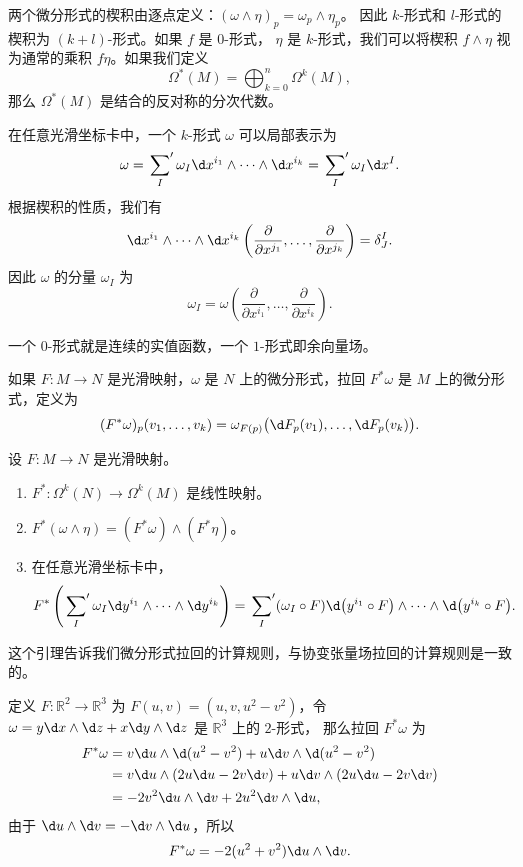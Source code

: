 两个微分形式的楔积由逐点定义：$(\omega\wedge\eta)_p=\omega_p\wedge\eta_p$。
因此 $k$-形式和 $l$-形式的楔积为 $(k+l)$-形式。如果 $f$ 是 $0$-形式，
$\eta$ 是 $k$-形式，我们可以将楔积 $f\wedge \eta$ 视为通常的乘积
$f\eta$。如果我们定义
\begin{equation}
  \Omega^*(M)=\bigoplus_{k=0}^n\Omega^k(M),
\end{equation}
那么 $\Omega^*(M)$ 是结合的反对称的分次代数。

在任意光滑坐标卡中，一个 $k$-形式 $\omega$ 可以局部表示为
\[
  \omega=\sideset{}{'}\sum_I\omega_I\d x^{i_1}\wedge
  \cdots\wedge \d x^{i_k}=\sideset{}{'}\sum_I\omega_I \d x^I.
\]
根据楔积的性质，我们有
\[
  \d x^{i_1}\wedge
  \cdots\wedge \d x^{i_k}
  \left(\frac{\partial}{\partial x^{j_1}},\dots,\frac{\partial}{\partial x^{j_k}}\right)
  =\delta_J^I.
\]
因此 $\omega$ 的分量 $\omega_I$ 为
\[
  \omega_I=\omega\left(\frac{\partial}{\partial x^{i_1}},\dots,\frac{\partial}{\partial x^{i_k}}\right)  .
\]

\begin{example}
  一个 $0$-形式就是连续的实值函数，一个 $1$-形式即余向量场。
\end{example}

如果 $F:M\to N$ 是光滑映射，$\omega$ 是 $N$ 上的微分形式，拉回
$F^*\omega$ 是 $M$ 上的微分形式，定义为
\[
  (F^*\omega)_p(v_1,\dots,v_k)=\omega_{F(p)}\bigl(\d F_p(v_1),\dots,\d F_p(v_k)\bigr)  .
\]

\begin{lemma}
  设 $F:M\to N$ 是光滑映射。
  \begin{enumerate}
    \item $F^*:\Omega^k(N)\to \Omega^k(M)$ 是线性映射。
    \item $F^*(\omega\wedge\eta)=(F^*\omega)\wedge(F^*\eta)$。
    \item 在任意光滑坐标卡中，
    \[
      F^*\left(\sideset{}{'}\sum_I\omega_I\d y^{i_1}\wedge\cdots\wedge\d y^{i_k}\right)  
      =\sideset{}{'}\sum_I(\omega_I\circ F)\d\bigl(y^{i_1}\circ F\bigr)\wedge
      \cdots\wedge \d \bigl(y^{i_k}\circ F\bigr).
    \]
  \end{enumerate}
\end{lemma}

这个引理告诉我们微分形式拉回的计算规则，与协变张量场拉回的计算规则是一致的。

\begin{example}
  定义 $F:\mathbb{R}^2\to \mathbb{R}^3$ 为 $F(u,v)=(u,v,u^2-v^2)$，令
  $\omega=y\d x\wedge\d z+x\d y\wedge\d z$ 是 $\mathbb{R}^3$ 上的 $2$-形式，
  那么拉回 $F^*\omega$ 为
  \begin{align*}
    F^*\omega&=v\d u\wedge\d (u^2-v^2)+u\d v\wedge\d (u^2-v^2)\\
    &=v\d u\wedge(2u\d u-2v\d v)+u\d v\wedge(2u\d u-2v\d v)\\
    &=-2v^2\d u\wedge\d v+2u^2\d v\wedge\d u,
  \end{align*}
  由于 $\d u\wedge\d v=-\d v\wedge \d u$，所以
  \[
    F^*\omega=-2(u^2+v^2)\d u\wedge\d v.  
  \]
\end{example}

